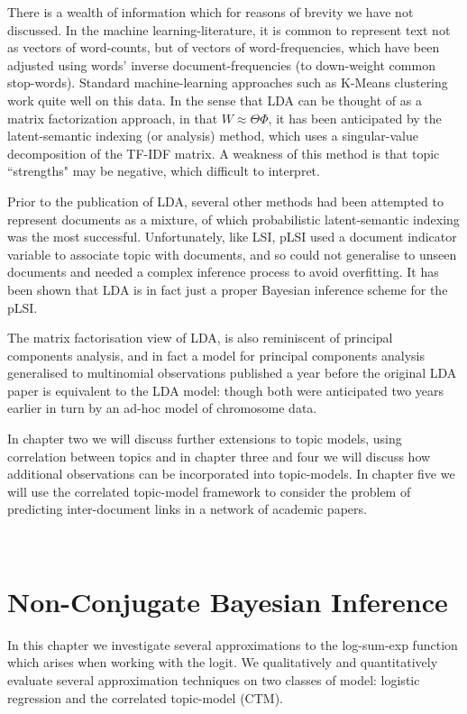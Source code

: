 There is a wealth of information which for reasons of brevity we have not discussed. In the machine learning-literature, it is common to represent text not as vectors of word-counts, but of vectors of word-frequencies, which have been adjusted using words' inverse document-frequencies (to down-weight common stop-words). Standard machine-learning approaches such as K-Means clustering work quite well on this data. In the sense that LDA can be thought of as a matrix factorization approach, in that $W \approx \Theta \Phi$, it has been anticipated by the latent-semantic indexing\cite{Deerwester1990} (or analysis) method, which uses a singular-value decomposition of the TF-IDF matrix. A weakness of this method is that topic ``strengths" may be negative, which difficult to interpret. 

Prior to the publication of LDA, several other methods had been attempted to represent documents as a mixture, of which probabilistic latent-semantic indexing \cite{Hofmann1999a} was the most successful. Unfortunately, like LSI, pLSI used a document indicator variable to associate topic with documents, and so could not generalise to unseen documents and needed a complex inference process to avoid overfitting. It has been shown\cite{GiKa2003} that LDA is in fact just a proper Bayesian inference scheme for the pLSI.

The matrix factorisation view of LDA, is also reminiscent of principal components analysis, and in fact a model for principal components analysis generalised to multinomial observations\cite{Buntine2002} published a year before the original LDA paper is equivalent to the LDA model: though both were anticipated two years earlier in turn by an ad-hoc model of chromosome data\cite{Pritchard2000}.

In chapter two we will discuss further extensions to topic models, using correlation between topics and in chapter three and four we will discuss how additional observations can be incorporated into topic-models. In chapter five we will use the correlated topic-model framework to consider the problem of predicting inter-document links in a network of academic papers.

\


\newcommand \xdat { { \mathcal{X} } }
\newcommand \xdoc { { \vv{x}_d } }
\newcommand \xdn { { \vv{x}_{dn} } }

\chapter{Non-Conjugate Bayesian Inference}
\label{sec:nonconj}
In this chapter we investigate several approximations to the log-sum-exp function which arises when working with the logit. We qualitatively and quantitatively evaluate several approximation techniques on two classes of model: logistic regression and the correlated topic-model (CTM).

